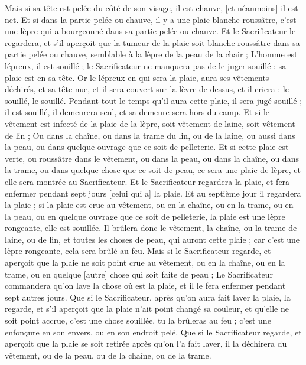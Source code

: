 \begin{multicols}{2}
Mais si sa tête est pelée du côté de son visage, il est chauve, [et néanmoins] il est net.
Et si dans la partie pelée ou chauve, il y a une plaie blanche-roussâtre, c'est une lèpre qui a bourgeonné dans sa partie pelée ou chauve.
Et le Sacrificateur le regardera, et s'il aperçoit que la tumeur de la plaie soit blanche-roussâtre dans sa partie pelée ou chauve, semblable à la lèpre de la peau de la chair ;
L'homme est lépreux, il est souillé ; le Sacrificateur ne manquera pas de le juger souillé : sa plaie est en sa tête.
Or le lépreux en qui sera la plaie, aura ses vêtements déchirés, et sa tête nue, et il sera couvert sur la lèvre de dessus, et il criera : le souillé, le souillé.
Pendant tout le temps qu'il aura cette plaie, il sera jugé souillé ; il est souillé, il demeurera seul, et sa demeure sera hors du camp.
Et si le vêtement est infecté de la plaie de la lèpre, soit vêtement de laine, soit vêtement de lin ;
Ou dans la chaîne, ou dans la trame du lin, ou de la laine, ou aussi dans la peau, ou dans quelque ouvrage que ce soit de pelleterie.
Et si cette plaie est verte, ou roussâtre dans le vêtement, ou dans la peau, ou dans la chaîne, ou dans la trame, ou dans quelque chose que ce soit de peau, ce sera une plaie de lèpre, et elle sera montrée au Sacrificateur.
Et le Sacrificateur regardera la plaie, et fera enfermer pendant sept jours [celui qui a] la plaie.
Et au septième jour il regardera la plaie ; si la plaie est crue au vêtement, ou en la chaîne, ou en la trame, ou en la peau, ou en quelque ouvrage que ce soit de pelleterie, la plaie est une lèpre rongeante, elle est souillée.
Il brûlera donc le vêtement, la chaîne, ou la trame de laine, ou de lin, et toutes les choses de peau, qui auront cette plaie ; car c'est une lèpre rongeante, cela sera brûlé au feu.
Mais si le Sacrificateur regarde, et aperçoit que la plaie ne soit point crue au vêtement, ou en la chaîne, ou en la trame, ou en quelque [autre] chose qui soit faite de peau ;
Le Sacrificateur commandera qu'on lave la chose où est la plaie, et il le fera enfermer pendant sept autres jours.
Que si le Sacrificateur, après qu'on aura fait laver la plaie, la regarde, et s'il aperçoit que la plaie n'ait point changé sa couleur, et qu'elle ne soit point accrue, c'est une chose souillée, tu la brûleras au feu ; c'est une enfonçure en son envers, ou en son endroit pelé.
Que si le Sacrificateur regarde, et aperçoit que la plaie se soit retirée après qu'on l'a fait laver, il la déchirera du vêtement, ou de la peau, ou de la chaîne, ou de la trame.

\end{multicols}
